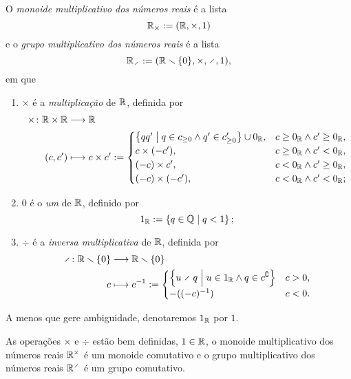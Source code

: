 \begin{definition}
O \emph{monoide multiplicativo dos números reais} é a lista
	\begin{equation*}
	\mathbb{R}_\times := (\mathbb{R},\times,1)
	\end{equation*}
e o \emph{grupo multiplicativo dos números reais} é a lista
	\begin{equation*}
	\R_{\div}:= (\R \setminus \{0\},\times,\div,1),
	\end{equation*}
em que
	\begin{enumerate}
	\item $\times$ é a \emph{multiplicação} de $\mathbb{R}$, definida por
		\begin{align*}
		\func{\times}{\R \times \R}{\R}{(c,c')}{
			c \times c' :=
			\begin{cases}
			\set{qq'}{q \in c_{\geq 0} \land q' \in c'_{\geq 0}} \cup 0_{\R},	& c \geq 0_{\R} \land c' \geq 0_{\R}, \\
			c \times (-c'),			& c \geq 0_{\R} \land c' < 0_{\R}, \\
			(-c) \times c',			& c < 0_{\R} \land c' \geq 0_{\R}, \\
			(-c) \times (-c'),		& c < 0_{\R} \land c' < 0_{\R};
			\end{cases}
		}
		\end{align*}
	\item $0$ é o \emph{um} de $\mathbb{R}$, definido por
		\begin{equation*}
		1_{\mathbb{R}} := \left\{{q \in \mathbb{Q}}\;\middle\vert\;{q < 1}\right\};
		\end{equation*}
	\item $\div$ é a \emph{inversa multiplicativa} de $\mathbb{R}$, definida por
		\begin{align*}
		\func{\div}{\R \setminus \{0\}}{\R \setminus \{0\}}{c}{
			c\inv :=
			\begin{cases}
			\set{u \div q}{u \in 1_{\R} \land q \in c^\complement}	& c > 0, \\
			-((-c)\inv)	& c < 0.
			\end{cases}
		}
		\end{align*}
	\end{enumerate}
\end{definition}

A menos que gere ambiguidade, denotaremos $1_{\mathbb{R}}$ por $1$.

\begin{exercise}
As operações $\times$ e $\div$ estão bem definidas, $1 \in \mathbb{R}$, o monoide multiplicativo dos números reais $\mathbb{R}^\times$ é um monoide comutativo e o grupo multiplicativo dos números reais $\R^{\div}$ é um grupo comutativo.
\end{exercise}

